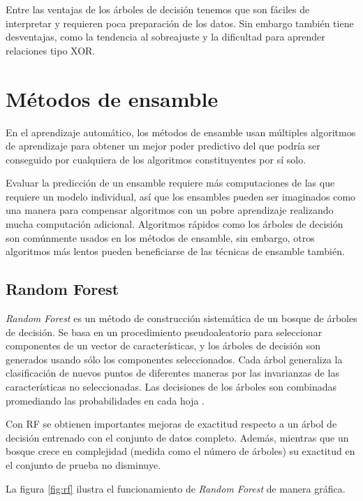 Entre las ventajas de los árboles de decisión tenemos que son fáciles de interpretar y requieren poca preparación de los datos. Sin embargo también tiene desventajas, como la tendencia al sobreajuste y la dificultad para aprender relaciones tipo XOR.

\section{Métodos de ensamble}

En el aprendizaje automático, los métodos de ensamble usan múltiples algoritmos de aprendizaje para obtener un mejor poder predictivo del que podría ser conseguido por cualquiera de los algoritmos constituyentes por sí solo.

Evaluar la predicción de un ensamble requiere más computaciones de las que requiere un modelo individual, así que los ensambles pueden ser imaginados como una manera para compensar algoritmos con un pobre aprendizaje realizando mucha computación adicional. Algoritmos rápidos como los árboles de decisión son comúnmente usados en los métodos de ensamble, sin embargo, otros algoritmos más lentos pueden beneficiarse de las técnicas de ensamble también.

\subsection{Random Forest}

\textit{Random Forest} es un método de construcción sistemática de un bosque de árboles de decisión. Se basa en un procedimiento pseudoaleatorio para seleccionar componentes de un vector de características, y los árboles de decisión son generados usando sólo los componentes seleccionados. Cada árbol generaliza la clasificación de nuevos puntos de diferentes maneras por las invarianzas de las características no seleccionadas. Las decisiones de los árboles son combinadas promediando las probabilidades en cada hoja \citep{ho1998random}.

Con \ac{RF} se obtienen importantes mejoras de exactitud respecto a un árbol de decisión entrenado con el conjunto de datos completo. Además, mientras que un bosque crece en complejidad (medida como el número de árboles) su exactitud en el conjunto de prueba no disminuye.

La figura \ref{fig:rf} ilustra el funcionamiento de \textit{Random Forest} de manera gráfica.

